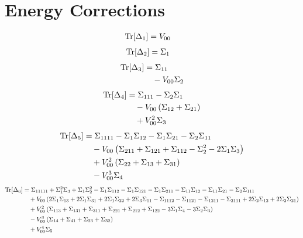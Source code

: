 \documentclass[12pt]{article}
\newcommand{\trdelta}[1]{\Tr[\Delta_{#1}]}
\begin{document}
\section*{Energy Corrections}
\begin{align*}
    \trdelta{1} &= V_{00}
\end{align*}
\begin{align*}
    \trdelta{2} &= \Sigma_1
\end{align*}
\begin{align*}
    \trdelta{3} &= \Sigma_{11} \\
    &\quad - V_{00}\Sigma_2
\end{align*}
\begin{align*}
    \trdelta{4} &= \Sigma_{111} - \Sigma_2\Sigma_1 \\
    &\quad - V_{00}\left(\Sigma_{12} + \Sigma_{21}\right) \\
    &\quad + V_{00}^2\Sigma_3
\end{align*}
\begin{align*}
    \trdelta{5} &= \Sigma_{1111} - \Sigma_1\Sigma_{12} - \Sigma_1\Sigma_{21} - \Sigma_2\Sigma_{11} \\
    &\quad - V_{00}\left(\Sigma_{211} + \Sigma_{121} + \Sigma_{112} - \Sigma_2^2 - 2\Sigma_1\Sigma_3\right) \\
    &\quad + V_{00}^2\left(\Sigma_{22} + \Sigma_{13} + \Sigma_{31}\right) \\
    &\quad - V_{00}^3\Sigma_4
\end{align*}
\begin{align*}
    \trdelta{6} &= \Sigma_{11111} + \Sigma_1^2\Sigma_3 + \Sigma_1\Sigma_2^2 - \Sigma_1\Sigma_{112} - \Sigma_1\Sigma_{121} - \Sigma_1\Sigma_{211} - \Sigma_{11}\Sigma_{12} - \Sigma_{11}\Sigma_{21} - \Sigma_2\Sigma_{111} \\
    &\quad + V_{00}\left( 2\Sigma_1\Sigma_{13} + 2\Sigma_1\Sigma_{31} + 2\Sigma_1\Sigma_{22} + 2\Sigma_3\Sigma_{11} - \Sigma_{1112} - \Sigma_{1121} - \Sigma_{1211} - \Sigma_{2111} + 2\Sigma_2\Sigma_{12} + 2\Sigma_2\Sigma_{21} \right) \\
    &\quad + V_{00}^2\left( \Sigma_{113} + \Sigma_{131} + \Sigma_{311} + \Sigma_{221} + \Sigma_{212} + \Sigma_{122} - 3\Sigma_1\Sigma_4 - 3\Sigma_2\Sigma_3 \right) \\
    &\quad - V_{00}^3\left( \Sigma_{14} + \Sigma_{41} + \Sigma_{23} + \Sigma_{32} \right) \\
    &\quad + V_{00}^4 \Sigma_5
\end{align*}
\end{document}
